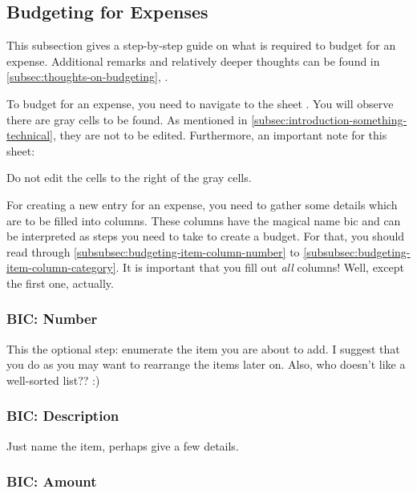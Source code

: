 \subsection{Budgeting for Expenses}
\label{subsec:budgeting-expenses}

This subsection gives a step-by-step guide on what is required to budget for an expense.
Additional remarks and relatively deeper thoughts can be found in \autoref{subsec:thoughts-on-budgeting}, .

To budget for an expense, you need to navigate to the sheet .
You will observe there are gray cells to be found.
As mentioned in \autoref{subsec:introduction-something-technical}, they are not to be edited.
Furthermore, an important note for this sheet:
\begin{specialnote}
	Do not edit the cells to the right of the gray cells.
\end{specialnote}

For creating a new entry for an expense, you need to gather some details which are to be filled into columns.
These columns have the magical name \ac{bic} and can be interpreted as steps you need to take to create a budget.
For that, you should read through \autoref{subsubsec:budgeting-item-column-number} to \autoref{subsubsec:budgeting-item-column-category}.
It is important that you fill out \emph{all} columns!
Well, except the first one, actually.

\subsubsection{BIC: Number}
\label{subsubsec:budgeting-item-column-number}

This the optional step: enumerate the item you are about to add.
I suggest that you do as you may want to rearrange the items later on.
Also, who doesn't like a well-sorted list?? :)

\subsubsection{BIC: Description}
\label{subsubsec:budgeting-item-column-description}

Just name the item, perhaps give a few details.

\subsubsection{BIC: Amount}
\label{subsubsec:budgeting-item-column-amount}

